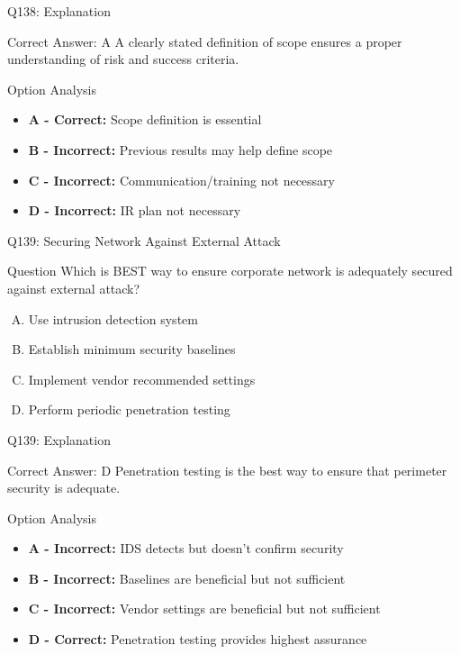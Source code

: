 \documentclass{beamer}
\begin{document}
	\begin{frame}{Q138: Explanation}
		\begin{block}{Correct Answer: A}
			A clearly stated definition of scope ensures a proper understanding of risk and success criteria.
		\end{block}
		\begin{block}{Option Analysis}
			\begin{itemize}
				\item \textbf{A - Correct:} Scope definition is essential
				\item \textbf{B - Incorrect:} Previous results may help define scope
				\item \textbf{C - Incorrect:} Communication/training not necessary
				\item \textbf{D - Incorrect:} IR plan not necessary
			\end{itemize}
		\end{block}
	\end{frame}
	
	\begin{frame}{Q139: Securing Network Against External Attack}
		\begin{block}{Question}
			Which is BEST way to ensure corporate network is adequately secured against external attack?
		\end{block}
		\begin{enumerate}[(A)]
			\item Use intrusion detection system
			\item Establish minimum security baselines
			\item Implement vendor recommended settings
			\item Perform periodic penetration testing
		\end{enumerate}
	\end{frame}
	
	\begin{frame}{Q139: Explanation}
		\begin{block}{Correct Answer: D}
			Penetration testing is the best way to ensure that perimeter security is adequate.
		\end{block}
		\begin{block}{Option Analysis}
			\begin{itemize}
				\item \textbf{A - Incorrect:} IDS detects but doesn't confirm security
				\item \textbf{B - Incorrect:} Baselines are beneficial but not sufficient
				\item \textbf{C - Incorrect:} Vendor settings are beneficial but not sufficient
				\item \textbf{D - Correct:} Penetration testing provides highest assurance
			\end{itemize}
		\end{block}
	\end{frame}
	
\end{document}
